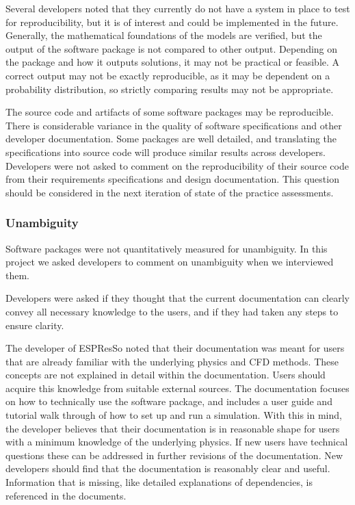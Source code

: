 \documentclass[12pt, notitlepage]{article}
\begin{document}
Several developers noted that they currently do not have a system in place to test for reproducibility, but it is of interest and could be implemented in the future. Generally, the mathematical foundations of the models are verified, but the output of the software package is not compared to other output. Depending on the package and how it outputs solutions, it may not be practical or feasible. A correct output may not be exactly reproducible, as it may be dependent on a probability distribution, so strictly comparing results may not be appropriate. 

The source code and artifacts of some software packages may be reproducible. There is considerable variance in the quality of software specifications and other developer documentation. Some packages are well detailed, and translating the specifications into source code will produce similar results across developers. Developers were not asked to comment on the reproducibility of their source code from their requirements specifications and design documentation. This question should be considered in the next iteration of state of the practice assessments. 

\subsubsection{Unambiguity}

Software packages were not quantitatively measured for unambiguity.
In this project we asked developers to comment on unambiguity when we interviewed them.

Developers were asked if they thought that the current documentation can clearly convey all necessary knowledge to the users, and if they had taken any steps to ensure clarity. 

The developer of ESPResSo noted that their documentation was meant for users that are already familiar with the underlying physics and CFD methods. These concepts are not explained in detail within the documentation. Users should acquire this knowledge from suitable external sources. The documentation focuses on how to technically use the software package, and includes a user guide and tutorial walk through of how to set up and run a simulation. With this in mind, the developer believes that their documentation is in reasonable shape for users with a minimum knowledge of the underlying physics. If new users have technical questions these can be addressed in further revisions of the documentation. New developers should find that the documentation is reasonably clear and useful. Information that is missing, like detailed explanations of dependencies, is referenced in the documents. 
\end{document}
